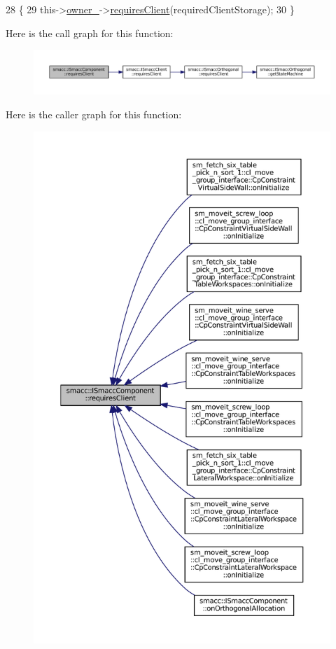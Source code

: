 \begin{DoxyCode}
28     \{
29         this->\hyperlink{classsmacc_1_1ISmaccComponent_a909590e672450ce0eb0d8facb45c737a}{owner\_}->\hyperlink{classsmacc_1_1ISmaccClient_a7a9990a2f3e35d547671188d69fee520}{requiresClient}(requiredClientStorage);
30     \}
\end{DoxyCode}
Here is the call graph for this function\+:
\nopagebreak
\begin{figure}[H]
\begin{center}
\leavevmode
\includegraphics[width=350pt]{classsmacc_1_1ISmaccComponent_a36c085d906fbae0fcaee817aaeafebf4_cgraph}
\end{center}
\end{figure}
Here is the caller graph for this function\+:
\nopagebreak
\begin{figure}[H]
\begin{center}
\leavevmode
\includegraphics[height=550pt]{classsmacc_1_1ISmaccComponent_a36c085d906fbae0fcaee817aaeafebf4_icgraph}
\end{center}
\end{figure}
